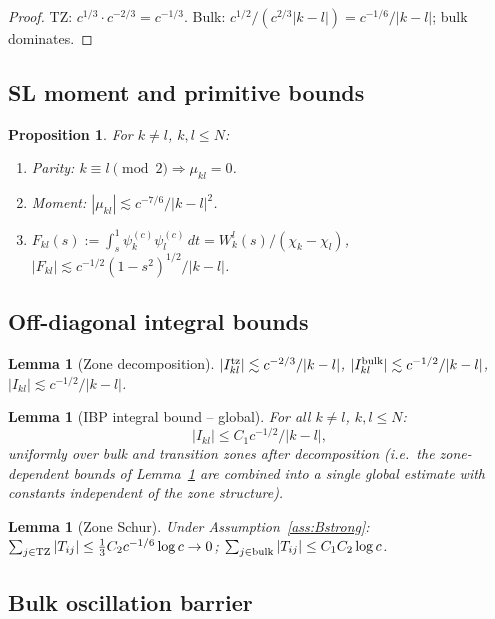 \documentclass[12pt,a4paper]{article}
\newtheorem{proposition}[theorem]{Proposition}
\newtheorem{lemma}[theorem]{Lemma}
\newcommand{\pswf}[1]{\psi_{#1}^{(c)}}
\begin{document}
\begin{proof}
TZ: $c^{1/3}\cdot c^{-2/3}=c^{-1/3}$.
Bulk: $c^{1/2}/(c^{2/3}|k-l|)=c^{-1/6}/|k-l|$; bulk dominates.
\end{proof}

\subsection{SL moment and primitive bounds}

\begin{proposition}\label{prop:moment}
For $k\neq l$, $k,l\leq N$:
\begin{enumerate}[label=(\alph*)]
  \item Parity: $k\equiv l\pmod2\Rightarrow\mu_{kl}=0$.
  \item Moment: $|\mu_{kl}|\lesssim c^{-7/6}/|k-l|^2$.
  \item $F_{kl}(s):=\int_s^1\pswf{k}\pswf{l}\,dt
        =W_k^l(s)/(\chi_k-\chi_l)$,\;
        $|F_{kl}|\lesssim c^{-1/2}(1-s^2)^{1/2}/|k-l|$.
\end{enumerate}
\end{proposition}

\subsection{Off-diagonal integral bounds}

\begin{lemma}[Zone decomposition]\label{lem:sublD}
$|I_{kl}^{\rm tz}|\lesssim c^{-2/3}/|k-l|$,\;
$|I_{kl}^{\rm bulk}|\lesssim c^{-1/2}/|k-l|$,\;
$|I_{kl}|\lesssim c^{-1/2}/|k-l|$.
\end{lemma}

\begin{lemma}[IBP integral bound -- global]\label{lem:RL}
For all $k\neq l$, $k,l\leq N$:
\[
  |I_{kl}|\leq C_1c^{-1/2}/|k-l|,
\]
uniformly over bulk and transition zones after decomposition
\textup{(}i.e.\ the zone-dependent bounds of Lemma~\ref{lem:sublD}
are combined into a single global estimate with constants
independent of the zone structure\textup{)}.
\end{lemma}

\begin{lemma}[Zone Schur]\label{lem:zone_schur}
Under Assumption~\ref{ass:Bstrong}:
$\sum_{j\in{\rm TZ}}|T_{ij}|\leq\tfrac{1}{3}C_2c^{-1/6}\log c\to0$;
$\sum_{j\in{\rm bulk}}|T_{ij}|\leq C_1C_2\log c$.
\end{lemma}

\subsection{Bulk oscillation barrier}
\label{sec:bulk_barrier}
\end{document}
